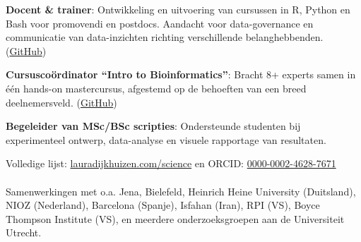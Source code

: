 \documentclass[a4paper,10pt]{article}
\begin{document}
\newpage

\begin{description}
  \raggedright
  \item[\normalfont \textcolor{ForestGreen}{\textbf{2022 -- heden}}] \textbf{Docent \& trainer}: 
    Ontwikkeling en uitvoering van cursussen in R, Python en Bash voor promovendi en postdocs. 
    Aandacht voor data-governance en communicatie van data-inzichten richting verschillende belanghebbenden.  
    (\href{https://github.com/lauralwd/professional_education}{GitHub})
  \item[\normalfont \textcolor{ForestGreen}{\textbf{2020 -- 2021}}] \textbf{Cursuscoördinator “Intro to Bioinformatics”}: 
    Bracht 8+ experts samen in één hands-on mastercursus, afgestemd op de behoeften van een breed deelnemersveld. 
    (\href{https://lauralwd.github.io/metagenomicspractical/}{GitHub})
  \item[\normalfont \textcolor{ForestGreen}{\textbf{2017 -- 2022}}] \textbf{Begeleider van MSc/BSc scripties}: 
    Ondersteunde studenten bij experimenteel ontwerp, data-analyse en visuele rapportage van resultaten.
\end{description}

\vfill



\noindent Volledige lijst: \href{https://lauradijkhuizen.com/science}{lauradijkhuizen.com/science} en
\noindent ORCID: \textcolor[HTML]{A6CE39}{\faOrcid}\href{https://orcid.org/0000-0002-4628-7671}{0000-0002-4628-7671}
\\\\
\noindent Samenwerkingen met o.a. Jena, Bielefeld, Heinrich Heine University (Duitsland), NIOZ (Nederland), Barcelona (Spanje), Isfahan (Iran), RPI (VS), Boyce Thompson Institute (VS), en meerdere onderzoeksgroepen aan de Universiteit Utrecht.

\vspace{0.5em}
\end{document}
